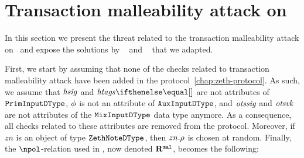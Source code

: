 \section{Transaction malleability attack on \zeth}

In this section we present the threat related to the transaction malleability attack on \zeth~and expose the solutions by \zerocash~\cite{sasson2014zerocash} and \zcash~\cite{zcashprotocol} that we adapted.

First, we start by assuming that none of the checks related to transaction malleability attack have been added in the protocol~\cref{chap:zeth-protocol}. As such, we assume that $\mathit{hsig}$ and $\htags{}$ are not attributes of ${\mathtt{PrimInputDType}}$, $\mathit{\phi}$ is not an attribute of ${\mathtt{AuxInputDType}}$, and $\mathit{otssig}$ and $\mathit{otsvk}$ are not attributes of the ${\mathtt{MixInputDType}}$ data type anymore. As a consequence, all checks related to these attributes are removed from the protocol. Moreover, if $zn$ is an object of type ${\mathtt{ZethNoteDType}}$, then $zn.\mathit{\rho}$ is chosen at random. Finally, the $\npol$-relation used in \zeth, now denoted $\mathbf{R}^{\texttt{mal}}$, becomes the following:

